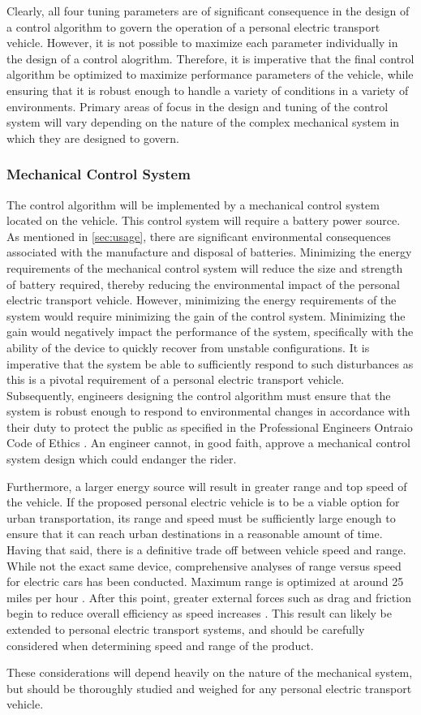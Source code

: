 Clearly, all four tuning parameters are of significant consequence in the design of a control algorithm to govern the operation of a personal electric transport vehicle. 
However, it is not possible to maximize each parameter individually in the design of a control alogrithm. 
Therefore, it is imperative that the final control algorithm be optimized to maximize performance parameters of the vehicle, while ensuring that it is robust enough to handle a variety of conditions in a variety of environments. 
Primary areas of focus in the design and tuning of the control system will vary depending on the nature of the complex mechanical system in which they are designed to govern.

\subsubsection{Mechanical Control System}
The control algorithm will be implemented by a mechanical control system located on the vehicle. 
This control system will require a battery power source.
As mentioned in \ref{sec:usage}, there are significant environmental consequences associated with the manufacture and disposal of batteries. 
Minimizing the energy requirements of the mechanical control system will reduce the size and strength of battery required, thereby reducing the environmental impact of the personal electric transport vehicle.  
However, minimizing the energy requirements of the system would require minimizing the gain of the control system. 
Minimizing the gain would negatively impact the performance of the system, specifically with the ability of the device to quickly recover from unstable configurations. 
It is imperative that the system be able to sufficiently respond to such disturbances as this is a pivotal requirement of a personal electric transport vehicle. 
Subsequently, engineers designing the control algorithm must ensure that the system is robust enough to respond to environmental changes in accordance with their duty to protect the public as specified in the Professional Engineers Ontraio Code of Ethics \cite{PEO}. 
An engineer cannot, in good faith, approve a mechanical control system design which could endanger the rider. 

Furthermore, a larger energy source will result in greater range and top speed of the vehicle. 
If the proposed personal electric vehicle is to be a viable option for urban transportation, its range and speed must be sufficiently large enough to ensure that it can reach urban destinations in a reasonable amount of time.
Having that said, there is a definitive trade off between vehicle speed and range. While not the exact same device, comprehensive analyses of range versus speed for electric cars has been conducted. Maximum range is optimized at around 25 miles per hour \cite{speeddrag}. After this point, greater external forces such as drag and friction begin to reduce overall efficiency as speed increases \cite{speeddrag}. This result can likely be extended to personal electric transport systems, and should be carefully considered when determining speed and range of the product.

These considerations will depend heavily on the nature of the mechanical system, but should be thoroughly studied and weighed for any personal electric transport vehicle.
